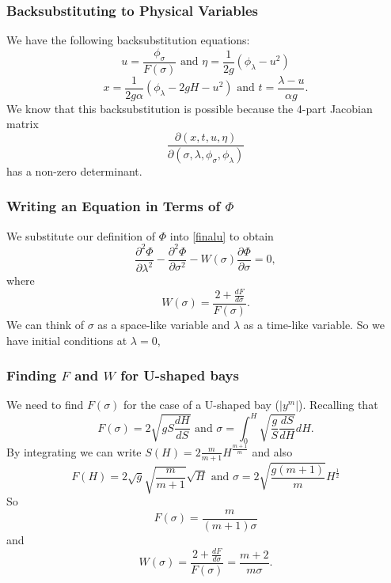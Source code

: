 \begin{frame}
\frametitle{Backsubstituting to Physical Variables}
We have the following backsubstitution equations:
\[
u = \frac{\phi_\sigma}{F(\sigma)} \text{ and } \eta = \frac{1}{2g}\left(\phi_\lambda - u^2\right)
\]
\[
x = \frac{1}{2g\alpha} \left(\phi_\lambda - 2gH - u^2 \right) \text{ and } t = \frac{\lambda - u}{\alpha g}.
\]
We know that this backsubstitution is possible because the 4-part Jacobian matrix
\[
\frac{\partial (x,t,u,\eta)}{\partial (\sigma,\lambda,\phi_\sigma,\phi_\lambda)}
\]
has a non-zero determinant.
\end{frame}


\begin{frame}
\frametitle{Writing an Equation in Terms of $\Phi$}
We substitute our definition of $\Phi$ into \eqref{finalu} to obtain
\begin{equation}\label{Phieq}
\frac{\partial^2 \Phi}{\partial \lambda^2} - \frac{\partial^2 \Phi}{\partial \sigma^2} - W(\sigma) \frac{\partial \Phi}{\partial \sigma} = 0,
\end{equation}
where
\[
W(\sigma) = \frac{2 + \frac{dF}{d\sigma}}{F(\sigma)}.
\]
We can think of $\sigma$ as a space-like variable and $\lambda$ as a time-like variable. So we have initial conditions at $\lambda = 0$,
\end{frame}


\begin{frame}
\frametitle{Finding $F$ and $W$ for U-shaped bays}
We need to find $F(\sigma)$ for the case of a U-shaped bay ($|y^m|$). Recalling that
\[
F(\sigma)= 2 \sqrt{gS \frac{dH}{dS}} \text{ and } \sigma = \int_0^H \sqrt{\frac{g}{S} \frac{dS}{dH}}dH.
\]
By integrating we can write $S(H)=2\frac{m}{m+1}H^{\frac{m+1}{m}}$ and also
\[
F(H)=2\sqrt{g} \sqrt{\frac{m}{m+1}} \sqrt{H} \text{ and } \sigma=2\sqrt{\frac{g(m+1)}{m}} H^{\frac12}
\]
So
\[F(\sigma)=\frac{m}{(m+1)\sigma}
\]
and
\[
W(\sigma) = \frac{2 + \frac{dF}{d\sigma}}{F(\sigma)}=\frac{m+2}{m\sigma}.
\]

\end{frame}




